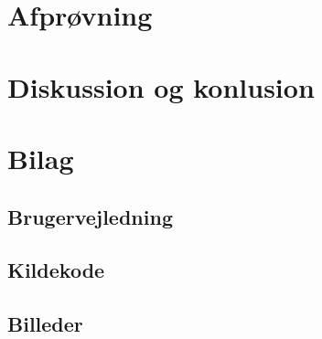 \documentclass[a4paper]{article}
\begin{document}
  \section{Afprøvning} \label{sec:unitTest}

	\section{Diskussion og konlusion} \label{sec:conclusion}
   
  \section{Bilag}
     
      \subsection{Brugervejledning} \label{ssec:manual}
        
      \subsection{Kildekode} \label{ssec:sourceCode}
        
        
        

      \subsection{Billeder}
        
\end{document}
